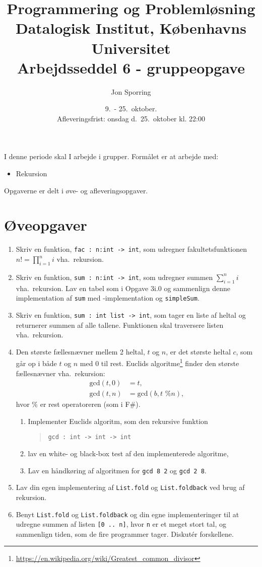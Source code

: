 \documentclass[a4paper,12pt]{article}
\title{Programmering og Problemløsning\\Datalogisk Institut,
  Københavns Universitet\\Arbejdsseddel 6 - gruppeopgave}
\author{Jon Sporring}
\date{9.\ - 25.\ oktober.\\Afleveringsfrist: onsdag d.\ 25.\ oktober kl. 22:00}
\begin{document}
\maketitle

I denne periode skal I arbejde i grupper. Formålet er at arbejde med:
\begin{itemize}
\item Rekursion
\end{itemize}
Opgaverne er delt i øve- og afleveringsopgaver. 

\section*{Øveopgaver}
\begin{enumerate}[label=6ø.\arabic*,start=0]
\item Skriv en funktion, \lstinline{fac : n:int -> int}, som udregner fakultetsfunktionen $n! = \prod_{i=1}^ni$ vha.\ rekursion.
\item Skriv en funktion, \lstinline{sum : n:int -> int}, som udregner summen $\sum_{i=1}^ni$ vha.\ rekursion. Lav en tabel som i Opgave 3i.0 og sammenlign denne implementation af \lstinline{sum} med -implementation og \lstinline{simpleSum}.
\item Skriv en funktion, \lstinline{sum : int list -> int}, som tager en liste af heltal og returnerer summen af alle tallene. Funktionen skal traversere listen vha.\ rekursion. 
\item \label{gcd} Den største fællesnævner mellem 2 heltal, $t$ og $n$, er det største heltal $c$, som går op i både $t$ og $n$ med $0$ til rest. Euclids algoritme\footnote{\url{https://en.wikipedia.org/wiki/Greatest_common_divisor}} finder den største fællesnævner vha.\ rekursion:
  \begin{align}
    \text{gcd}(t,0) &= t, \label{gcd:1}
    \\ \text{gcd}(t,n) &= \text{gcd}(b, t \text{ \% } n), \label{gcd:2}
  \end{align}
hvor $\%$ er rest operatoreren (som i F\#). 
\begin{enumerate}
\item Implementer Euclids algoritm, som den rekursive funktion
  \begin{quote}
    \lstinline{gcd : int -> int -> int}
  \end{quote}
\item lav en white- og black-box test af den implementerede algoritme,
\item Lav en håndkøring af algoritmen for \lstinline{gcd 8 2} og \lstinline{gcd 2 8}.
\end{enumerate}
\item Lav din egen implementering af \lstinline{List.fold} og \lstinline{List.foldback} ved brug af rekursion. 
\item Benyt \lstinline{List.fold} og \lstinline{List.foldback} og din egne implementeringer til at udregne summen af listen \lstinline{[0 .. n]}, hvor \lstinline{n} er et meget stort tal, og sammenlign tiden, som de fire programmer tager. Diskut\'{e}r forskellene.
\end{enumerate}
\end{document}

